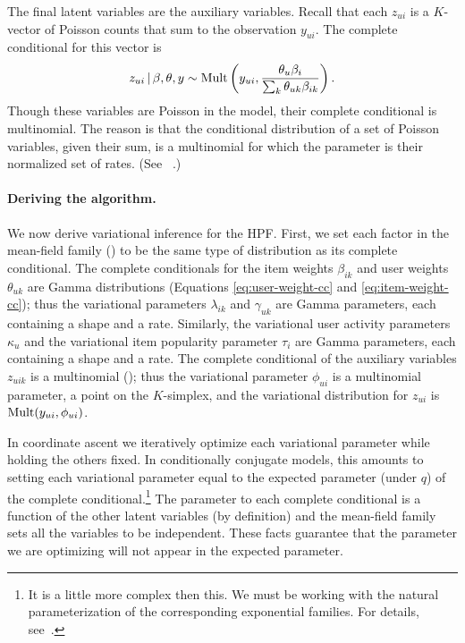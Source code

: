 The final latent variables are the auxiliary variables.  Recall that
each $z_{ui}$ is a $K$-vector of Poisson counts that sum to the
observation $y_{ui}$. The complete conditional for this vector is
\begin{equation}
  \label{eq:aux-cc}
  z_{ui} \,\vert\, \beta, \theta, y \sim \textrm{Mult}\left(y_{ui}, \frac{\theta_{u} 
      \beta_{i}}{\textstyle \sum_{k} \theta_{uk} \beta_{ik}}\right).
\end{equation}
Though these variables are Poisson in the model, their complete
conditional is multinomial.  The reason is that the conditional
distribution of a set of Poisson variables, given their sum, is a
multinomial for which the parameter is their normalized set of
rates. (See ~\cite{Johnson:2005, Cemgil:2009}.)

\paragraph{Deriving the algorithm.}
We now derive variational inference for the HPF. First, we set each
factor in the mean-field family () to be the same type of
distribution as its complete conditional.  The complete conditionals
for the item weights $\beta_{ik}$ and user weights $\theta_{uk}$ are
Gamma distributions (Equations \ref{eq:user-weight-cc} and
\ref{eq:item-weight-cc}); thus the variational parameters
$\lambda_{ik}$ and $\gamma_{uk}$ are Gamma parameters, each containing
a shape and a rate.  Similarly, the variational user activity
parameters $\kappa_u$ and the variational item popularity parameter
$\tau_i$ are Gamma parameters, each containing a shape and a rate.
The complete conditional of the auxiliary variables $z_{uik}$ is a
multinomial (); thus the variational parameter
$\phi_{ui}$ is a multinomial parameter, a point on the $K$-simplex,
and the variational distribution for $z_{ui}$ is $\textrm{Mult}(y_{ui},
\phi_{ui})$.

In coordinate ascent we iteratively optimize each variational
parameter while holding the others fixed.  In conditionally conjugate
models, this amounts to setting each variational parameter equal to
the expected parameter (under $q$) of the complete
conditional.\footnote{It is a little more complex then this.  We must
  be working with the natural parameterization of the corresponding
  exponential families.  For details, see~\cite{Hoffman:2013}.}  The
parameter to each complete conditional is a function of the other
latent variables (by definition) and the mean-field family sets all
the variables to be independent.  These facts guarantee that the
parameter we are optimizing will not appear in the expected parameter.

